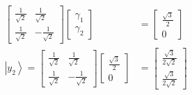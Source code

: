 \documentclass[main.tex]{subfiles}
\begin{document}
\begin{enumerate}
\begin{enumerate}
\begin{align*}
            \left[\begin{array}{ll} \frac{1}{\sqrt{2}} & \frac{1}{\sqrt{2}} 
            \\ \frac{1}{\sqrt{2}} & -\frac{1}{\sqrt{2}} \end{array}\right]
            \left[\begin{array}{l} \gamma_{1} \\ \gamma_{2} \end{array}\right]                                  & = \left[\begin{array}{c} \frac{\sqrt{3}}{2} \\ 0 \end{array}\right] \tag{matrix is unitary, inverse is the adjoint}\\
            \left|y_{2}\right\rangle =
            \left[\begin{array}{ll} \frac{1}{\sqrt{2}} & \frac{1}{\sqrt{2}} 
            \\ \frac{1}{\sqrt{2}} & -\frac{1}{\sqrt{2}} \end{array}\right]
            \left[\begin{array}{c} \frac{\sqrt{3}}{2} \\ 0 \end{array}\right]                                   & = \left[\begin{array}{c} \frac{\sqrt{3}}{2\sqrt{2}} \\ \frac{\sqrt{3}}{2\sqrt{2}} \end{array}\right] \tag{new basis}\\
        \end{align*}
    \end{enumerate}


\end{enumerate}
\end{document}
